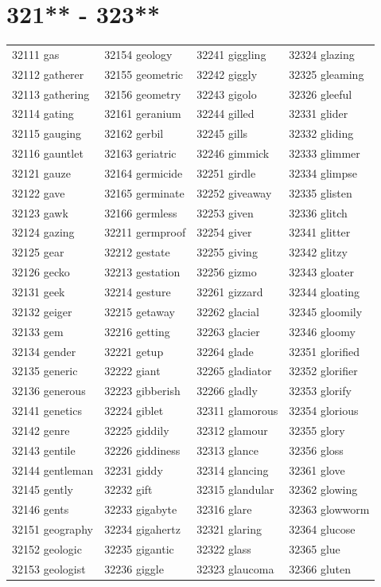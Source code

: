 \documentclass[10pt, oneside]{book}
\begin{document}
\begin{table}
	\centering
	\section*{321** - 323**}
	\begin{tabular}{l l l l}
32111 gas &32154 geology &32241 giggling &32324 glazing\\
32112 gatherer &32155 geometric &32242 giggly &32325 gleaming\\
32113 gathering &32156 geometry &32243 gigolo &32326 gleeful\\
32114 gating &32161 geranium &32244 gilled &32331 glider\\
32115 gauging &32162 gerbil &32245 gills &32332 gliding\\
32116 gauntlet &32163 geriatric &32246 gimmick &32333 glimmer\\
32121 gauze &32164 germicide &32251 girdle &32334 glimpse\\
32122 gave &32165 germinate &32252 giveaway &32335 glisten\\
32123 gawk &32166 germless &32253 given &32336 glitch\\
32124 gazing &32211 germproof &32254 giver &32341 glitter\\
32125 gear &32212 gestate &32255 giving &32342 glitzy\\
32126 gecko &32213 gestation &32256 gizmo &32343 gloater\\
32131 geek &32214 gesture &32261 gizzard &32344 gloating\\
32132 geiger &32215 getaway &32262 glacial &32345 gloomily\\
32133 gem &32216 getting &32263 glacier &32346 gloomy\\
32134 gender &32221 getup &32264 glade &32351 glorified\\
32135 generic &32222 giant &32265 gladiator &32352 glorifier\\
32136 generous &32223 gibberish &32266 gladly &32353 glorify\\
32141 genetics &32224 giblet &32311 glamorous &32354 glorious\\
32142 genre &32225 giddily &32312 glamour &32355 glory\\
32143 gentile &32226 giddiness &32313 glance &32356 gloss\\
32144 gentleman &32231 giddy &32314 glancing &32361 glove\\
32145 gently &32232 gift &32315 glandular &32362 glowing\\
32146 gents &32233 gigabyte &32316 glare &32363 glowworm\\
32151 geography &32234 gigahertz &32321 glaring &32364 glucose\\
32152 geologic &32235 gigantic &32322 glass &32365 glue\\
32153 geologist &32236 giggle &32323 glaucoma &32366 gluten\\
	\end{tabular}
 \end{table}
\clearpage
\end{document}
